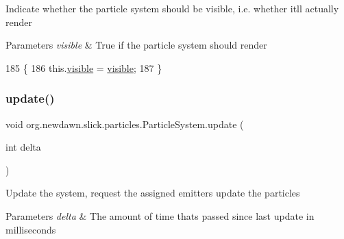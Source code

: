 Indicate whether the particle system should be visible, i.\+e. whether it\textquotesingle{}ll actually render


\begin{DoxyParams}{Parameters}
{\em visible} & True if the particle system should render \\
\hline
\end{DoxyParams}

\begin{DoxyCode}
185                                             \{
186         this.\mbox{\hyperlink{classorg_1_1newdawn_1_1slick_1_1particles_1_1_particle_system_ad2769d90adecc35330066468f02ac881}{visible}} = \mbox{\hyperlink{classorg_1_1newdawn_1_1slick_1_1particles_1_1_particle_system_ad2769d90adecc35330066468f02ac881}{visible}};
187     \}
\end{DoxyCode}
\mbox{\label{classorg_1_1newdawn_1_1slick_1_1particles_1_1_particle_system_a1331df1f902b7c6777b19dc798fbba80}} 
\subsubsection{\texorpdfstring{update()}{update()}}
{\footnotesize\ttfamily void org.\+newdawn.\+slick.\+particles.\+Particle\+System.\+update (\begin{DoxyParamCaption}\item[{int}]{delta }\end{DoxyParamCaption})\hspace{0.3cm}{\ttfamily [inline]}}

Update the system, request the assigned emitters update the particles


\begin{DoxyParams}{Parameters}
{\em delta} & The amount of time thats passed since last update in milliseconds \\
\hline
\end{DoxyParams}

